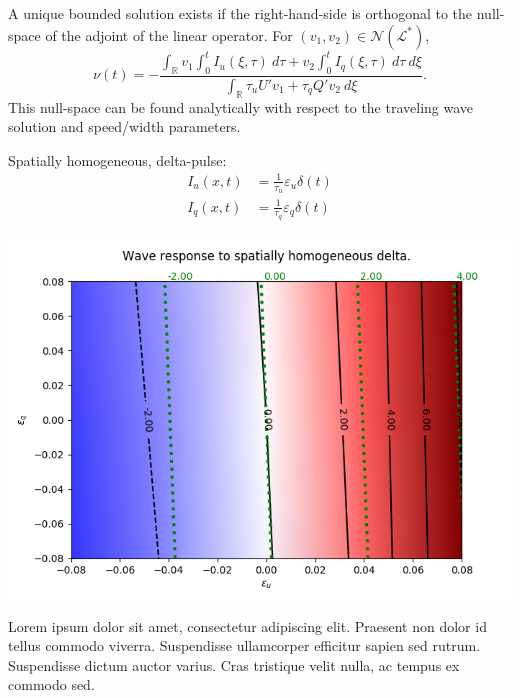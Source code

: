 \documentclass[landscape,final]{baposter}
\newcommand{\RR}{\mathbb{R}}
\newcommand{\LL}{\mathcal{L}}
\begin{document}
\begin{poster}
{	A unique bounded solution exists if the right-hand-side is orthogonal to the null-space of the adjoint of the linear operator. For $(v_1, v_2) \in \mathcal{N}(\LL^*)$, 
	\[
		\nu(t) = - \frac{\int_\RR v_1 \int_0^t I_u(\xi, \tau) \ d\tau + v_2 \int_0^t I_q(\xi, \tau) \ d\tau \ d\xi}{\int_\RR \tau_u U' v_1 + \tau_q Q' v_2 \ d\xi}.
	\]
	This null-space can be found analytically with respect to the traveling wave solution and speed/width parameters.
	\vspace{.2cm}
}

{
	Spatially homogeneous, delta-pulse: 
	\begin{align*}
		I_u(x, t) &= \frac{1}{\tau_u} \varepsilon_u \delta(t) \\
		I_q(x, t) &= \frac{1}{\tau_q} \varepsilon_q \delta(t)
	\end{align*}
	\begin{center}
		\includegraphics[width=.9\linewidth]{delta_time_amp_grid}
	\end{center}
}

{
	Lorem ipsum dolor sit amet, consectetur adipiscing elit. Praesent non dolor id tellus commodo viverra. Suspendisse ullamcorper efficitur sapien sed rutrum. Suspendisse dictum auctor varius. Cras tristique velit nulla, ac tempus ex commodo sed. 
}


\end{poster}
\end{document}

